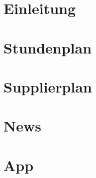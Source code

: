 \section{Einleitung}



\section{Stundenplan}



\section{Supplierplan}



\section{News}



\section{App}


